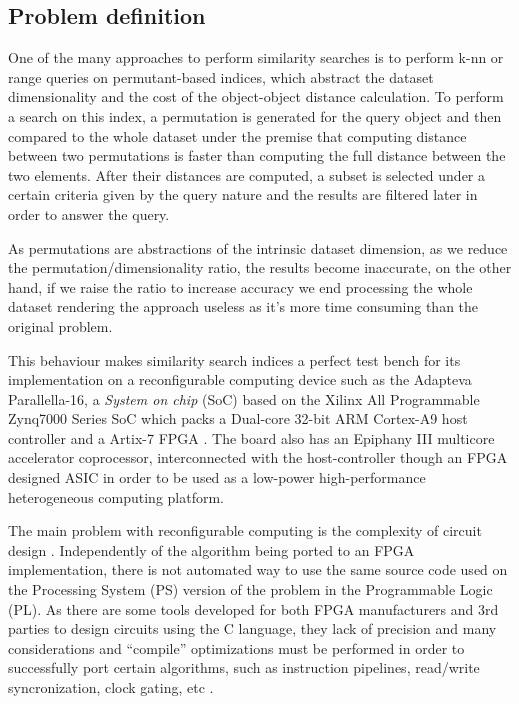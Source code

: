 \documentclass[11pt,letterpaper]{article}
\begin{document}
\subsection{Problem definition} 
    One of the many approaches to perform similarity searches is to perform k-nn or range queries on permutant-based 
    indices, which abstract the dataset dimensionality and the cost of the object-object distance calculation. To 
    perform a search on this index, a permutation is generated for the query object and then compared to the whole 
    dataset under the premise that computing distance between two permutations is faster than computing the full 
    distance between the two elements. After their distances are computed, a subset is selected under a certain 
    criteria given by the query nature and the results are filtered later in order to answer the query.
    \cite{5271946,5271944}


    As permutations are abstractions of the intrinsic dataset dimension, as we reduce the permutation/dimensionality 
    ratio, the results become inaccurate, on the other hand, if we raise the ratio to increase accuracy we end 
    processing the whole dataset rendering the approach useless as it's more time consuming than the original 
    problem.

    This behaviour makes similarity search indices a perfect test bench for its implementation on a reconfigurable
    computing device\cite{5999889} such as the Adapteva Parallella-16, a \emph{System on chip} (SoC) based on the 
    Xilinx All Programmable Zynq7000 Series SoC which packs a Dual-core 32-bit ARM Cortex-A9 host controller and a 
    Artix-7 FPGA \cite{DBLP:journals/corr/OlofssonNZ14,LINLEY_1}.
    The board also has an Epiphany III multicore accelerator coprocessor, interconnected with the host-controller
    though an FPGA designed ASIC in order to be used as a low-power high-performance heterogeneous computing 
    platform.

    The main problem with reconfigurable computing is the complexity of circuit design \cite{SPA_thesis}. 
    Independently of the algorithm being ported to an FPGA implementation, there is not automated way to use
    the same source code used on the Processing System (PS) version of the problem in the Programmable Logic (PL). 
    As there are some tools developed for both FPGA manufacturers and 3rd parties to design circuits using the C 
    language, they lack of precision and many considerations and ``compile'' optimizations must be performed 
    in order to successfully port certain algorithms\cite{SPA_thesis}, such as instruction pipelines, read/write 
    syncronization, clock gating\cite{XILINX_clockgating}, etc \cite{XILINX_axi,XILINX_clockgating,
    XILINX_ddr_rate,XILINX_mem_interface}.
\end{document}
